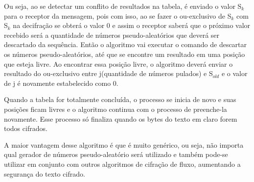 Ou seja, ao se detectar um conflito de resultados na tabela, é enviado o valor S$_k$ para o receptor da mensagem, pois com isso, ao se fazer o ou-exclusivo de S$_k$ com S$_k$ na decifração se obterá o valor 0 e assim o receptor saberá que o próximo valor recebido será a quantidade de números pseudo-aleatórios que deverá ser descartado da sequência. Então o algoritmo vai executar o comando de descartar os números pseudo-aleatórios, até que se encontre um resultado em uma posição que esteja livre. Ao encontrar essa posição livre, o algoritmo deverá enviar o resultado do ou-exclusivo entre j(quantidade de números pulados) e S$_{old}$ e o valor de j é novamente estabelecido como 0.

Quando a tabela for totalmente concluída, o processo se inicia de novo e suas posições ficam livres e o algoritmo continua com o processo de preenche-la novamente. Esse processo só finaliza quando os bytes do texto em claro forem todos cifrados. 

A maior vantagem desse algoritmo é que é muito genérico, ou seja, não importa qual gerador de números pseudo-aleatório será utilizado e também pode-se utilizar em conjunto com outros algoritmos de cifração de fluxo, aumentando a segurança do texto cifrado.